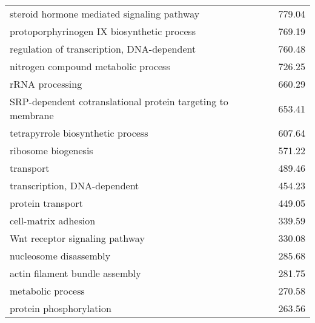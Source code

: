 \begin{table}[hp]
\begin{center}
\begin{tabular}{p{}r}
steroid hormone mediated signaling pathway                              & 779.04                      \\ %
protoporphyrinogen IX biosynthetic process                              & 769.19                      \\ %
regulation of transcription, DNA-dependent                              & 760.48                      \\ 
nitrogen compound metabolic process                                     & 726.25                      \\
rRNA processing                                                         & 660.29                      \\
SRP-dependent cotranslational protein targeting to membrane             & 653.41                      \\
tetrapyrrole biosynthetic process                                       & 607.64                      \\
ribosome biogenesis                                                     & 571.22                      \\
transport                                                               & 489.46                      \\
transcription, DNA-dependent                                            & 454.23                      \\
protein transport                                                       & 449.05                      \\
cell-matrix adhesion                                                    & 339.59                      \\
Wnt receptor signaling pathway                                          & 330.08                      \\
nucleosome disassembly                                                  & 285.68                      \\ %
actin filament bundle assembly                                          & 281.75                      \\
metabolic process                                                       & 270.58                      \\
protein phosphorylation                                                 & 263.56                      \\

\end{tabular}
\end{center}
\end{table}
